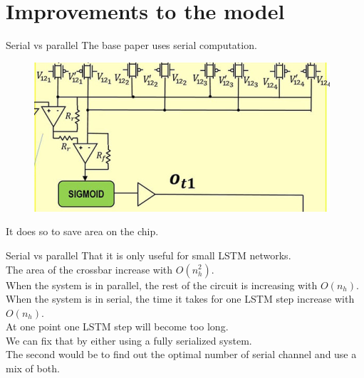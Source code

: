 \documentclass{beamer}
\begin{document}
\section{Improvements to the model}
\begin{frame}{Serial vs parallel}
  The base paper uses serial computation.
  \begin{figure}
    \centering
    \includegraphics[height=0.5\textheight]{figures/parallel.png}
  \end{figure}
  It does so to save area on the chip.
\end{frame}
\begin{frame}{Serial vs parallel}
  That it is only useful for small LSTM networks.\\
  The area of the crossbar increase with $O(n_h^2)$.\\
  When the system is in parallel, the rest of the circuit is increasing with $O(n_h)$.\\
  When the system is in serial, the time it takes for one LSTM step increase with $O(n_h)$.\\
  At one point one LSTM step will become too long.\\
  We can fix that by either using a fully serialized system.\\
  The second would be to find out the optimal number of serial channel and use a mix of both.
\end{frame}
\end{document}
